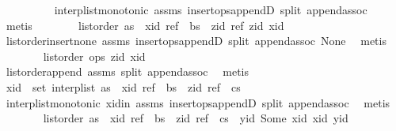 \begin{isabellebody}
\ \ \ \ \ \ \ \ \isamarkupfalse%
\ interp{\isacharunderscore}list{\isacharunderscore}monotonic\ assms{\isacharparenleft}{}{\isacharparenright}\ insert{\isacharunderscore}ops{\isacharunderscore}appendD\ split\ append{\isachardot}assoc\ \isamarkupfalse%
\ metis\isanewline
\ \ \ \ \ \ \isamarkupfalse%
\ {\isachardoublequoteopen}list{\isacharunderscore}order\ {\isacharparenleft}as\ {\isacharat}\ {\isacharbrackleft}{\isacharparenleft}xid{\isacharcomma}\ ref{\isacharparenright}{\isacharbrackright}\ {\isacharat}\ bs\ {\isacharat}\ {\isacharbrackleft}{\isacharparenleft}zid{\isacharcomma}\ ref{\isacharparenright}{\isacharbrackright}{\isacharparenright}\ zid\ xid{\isachardoublequoteclose}\isanewline
\ \ \ \ \ \ \ \ \isamarkupfalse%
\ list{\isacharunderscore}order{\isacharunderscore}insert{\isacharunderscore}none\ assms{\isacharparenleft}{}{\isacharparenright}\ insert{\isacharunderscore}ops{\isacharunderscore}appendD\ split\ append{\isachardot}assoc\ None\ \isamarkupfalse%
\ metis\isanewline
\ \ \ \ \ \ \isamarkupfalse%
\ {\isachardoublequoteopen}list{\isacharunderscore}order\ ops\ zid\ xid{\isachardoublequoteclose}\isanewline
\ \ \ \ \ \ \ \ \isamarkupfalse%
\ list{\isacharunderscore}order{\isacharunderscore}append\ assms{\isacharparenleft}{}{\isacharparenright}\ split\ append{\isachardot}assoc\ \isamarkupfalse%
\ metis\isanewline
\ \ \ \ \ \ \isamarkupfalse%
\ \isamarkupfalse%
\ {\isachardoublequoteopen}xid\ {\isasymin}\ set\ {\isacharparenleft}interp{\isacharunderscore}list\ {\isacharparenleft}as\ {\isacharat}\ {\isacharbrackleft}{\isacharparenleft}xid{\isacharcomma}\ ref{\isacharparenright}{\isacharbrackright}\ {\isacharat}\ bs\ {\isacharat}\ {\isacharbrackleft}{\isacharparenleft}zid{\isacharcomma}\ ref{\isacharparenright}{\isacharbrackright}\ {\isacharat}\ cs{\isacharparenright}{\isacharparenright}{\isachardoublequoteclose}\isanewline
\ \ \ \ \ \ \ \ \isamarkupfalse%
\ interp{\isacharunderscore}list{\isacharunderscore}monotonic\ xid{\isacharunderscore}in\ assms{\isacharparenleft}{}{\isacharparenright}\ insert{\isacharunderscore}ops{\isacharunderscore}appendD\ split\ append{\isachardot}assoc\ \isamarkupfalse%
\ metis\isanewline
\ \ \ \ \ \ \isamarkupfalse%
\ {\isachardoublequoteopen}list{\isacharunderscore}order\ {\isacharparenleft}as\ {\isacharat}\ {\isacharbrackleft}{\isacharparenleft}xid{\isacharcomma}\ ref{\isacharparenright}{\isacharbrackright}\ {\isacharat}\ bs\ {\isacharat}\ {\isacharbrackleft}{\isacharparenleft}zid{\isacharcomma}\ ref{\isacharparenright}{\isacharbrackright}\ {\isacharat}\ cs\ {\isacharat}\ {\isacharbrackleft}{\isacharparenleft}yid{\isacharcomma}\ Some\ xid{\isacharparenright}{\isacharbrackright}{\isacharparenright}\ xid\ yid{\isachardoublequoteclose}\isanewline

\end{isabellebody}
